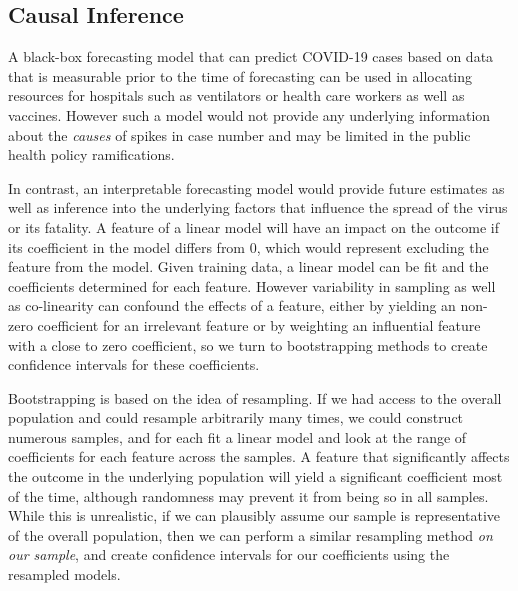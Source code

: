\documentclass[11pt]{article}
\begin{document}
%


\subsection{Causal Inference}

A black-box forecasting model that can predict COVID-19 cases based on data that is measurable prior to the time of forecasting can be used in allocating resources for hospitals such as ventilators or health care workers as well as vaccines. However such a model would not provide any underlying information about the \textit{causes} of spikes in case number and may be limited in the public health policy ramifications. 

In contrast, an interpretable forecasting model would provide future estimates as well as inference into the underlying factors that influence the spread of the virus or its fatality. A feature of a linear model will have an impact on the outcome if its coefficient in the model differs from 0, which would represent excluding the feature from the model. Given training data, a linear model can be fit and the coefficients determined for each feature. However variability in sampling as well as co-linearity can confound the effects of a feature, either by yielding an non-zero coefficient for an irrelevant feature or by weighting an influential feature with a close to zero coefficient, so we turn to bootstrapping methods to create confidence intervals for these coefficients. 

Bootstrapping is based on the idea of resampling. If we had access to the overall population and could resample arbitrarily many times, we could construct numerous samples, and for each fit a linear model and look at the range of coefficients for each feature across the samples. A feature that significantly affects the outcome in the underlying population will yield a significant coefficient most of the time, although randomness may prevent it from being so in all samples. While this is unrealistic, if we can plausibly assume our sample is representative of the overall population, then we can perform a similar resampling method \textit{on our sample}, and create confidence intervals for our coefficients using the resampled models.  
\end{document}
